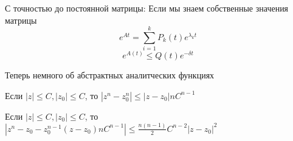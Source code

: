 С точностью до постоянной матрицы: 
Если мы знаем собственные значения матрицы
$$ e^{At} = \sum_{i=1}^k P_k(t)e^{\lambda_k t}$$
$$e^{A(t)} \le Q(t)e^{-\delta t}$$


Теперь немного об абстрактных аналитческих функциях


\lemma{} Если $|z|\le C, |z_0|\le C$, то $|z^n-z_0^n| \le |z-z_0|nC^{n-1}$


\lemma{} Если $|z|\le C, |z_0|\le C$, то $|z^n-z_0 -z_0^{n-1}(z-z_0)nC^{n-1}|  \le \frac{n(n-1)}2C^{n-2}|z-z_0|^2$

